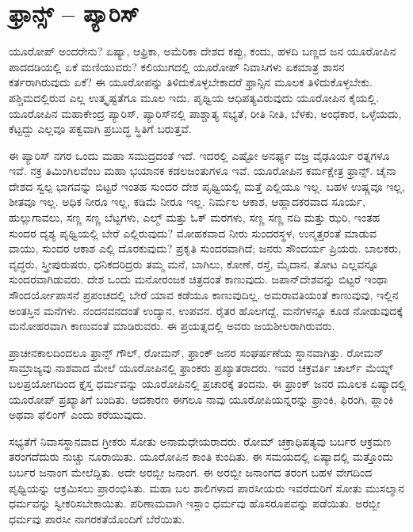 \newpage

\section*{ಫ್ರಾನ್ಸ್ – ಪ್ಯಾರಿಸ್}

ಯೂರೋಪ್​ ಅಂದರೇನು? ಏಷ್ಯಾ, ಆಫ್ರಿಕಾ, ಅಮೆರಿಕಾ ದೇಶದ ಕಪ್ಪು, ಕಂದು, ಹಳದಿ ಬಣ್ಣದ ಜನ ಯೂರೋಪಿನ ಪಾದದಡಿಯಲ್ಲಿ ಏಕೆ ಮಣಿಯುವರು? ಕಲಿಯುಗದಲ್ಲಿ ಯೂರೋಪ್​ ನಿವಾಸಿಗಳು ಏಕಮಾತ್ರ ಶಾಸನ ಕರ್ತರಾಗಿರುವುದು ಏಕೆ? ಈ ಯೂರೋಪನ್ನು ತಿಳಿದುಕೊಳ್ಳಬೇಕಾದರೆ ಫ್ರಾನ್ಸಿನ ಮೂಲಕ ತಿಳಿದುಕೊಳ್ಳಬೇಕು. ಪಶ್ಚಿಮದಲ್ಲಿರುವ ಎಲ್ಲ ಉತ್ಕೃಷ್ಟತೆಗೂ ಮೂಲ ಇದು. ಪೃಥ್ವಿಯ ಆಧಿಪತ್ಯವಿರುವುದು ಯೂರೋಪಿನ ಕೈಯಲ್ಲಿ. ಯೂರೋಪಿನ ಮಹಾಕೇಂದ್ರ ಪ್ಯಾರಿಸ್​. ಪ್ಯಾರಿಸ್​ನಲ್ಲಿ ಪಾಶ್ಚಾತ್ಯ ಸಭ್ಯತೆ, ರೀತಿ ನೀತಿ, ಬೆಳಕು, ಅಂಧಕಾರ, ಒಳ್ಳೆಯದು, ಕೆಟ್ಟದ್ದು ಎಲ್ಲವೂ ಪಕ್ವವಾಗಿ ಪ್ರಬುದ್ಧ ಸ್ಥಿತಿಗೆ ಬರುತ್ತವೆ.

ಈ ಪ್ಯಾರಿಸ್​ ನಗರ ಒಂದು ಮಹಾ ಸಮುದ್ರದಂತೆ ಇದೆ. ಇದರಲ್ಲಿ ಎಷ್ಟೋ ಅನರ್ಘ್ಯ ವಜ್ರ ವೈಢೂರ್ಯ ರತ್ನಗಳೂ ಇವೆ. ನಕ್ರ ತಿಮಿಂಗಿಲವೆಂಬ ಮಹಾ ಭಯಾನಕ ಕಡಲಜಂತುಗಳೂ ಇವೆ. ಯೂರೋಪಿನ ಕರ್ಮಕ್ಷೇತ್ರ ಫ್ರಾನ್ಸ್​. ಚೈನಾ ದೇಶದ ಸ್ವಲ್ಪ ಭಾಗವನ್ನು ಬಿಟ್ಟರೆ ಇಂತಹ ಸುಂದರ ದೇಶ ಪೃಥ್ವಿಯಲ್ಲಿ ಮತ್ತೆ ಎಲ್ಲಿಯೂ ಇಲ್ಲ. ಬಹಳ ಉಷ್ಣವೂ ಇಲ್ಲ, ಶೀತವೂ ಇಲ್ಲ. ಅಧಿಕ ನೀರೂ ಇಲ್ಲ, ಕಡಿಮೆ ನೀರೂ ಇಲ್ಲ. ನಿರ್ಮಲ ಆಕಾಶ, ಆಹ್ಲಾದಕರವಾದ ಸೂರ್ಯ, ಹುಲ್ಲುಗಾವಲು, ಸಣ್ಣ ಸಣ್ಣ ಬೆಟ್ಟಗಳು, ಎಲ್ಮ್​ ಮತ್ತು ಓಕ್​ ಮರಗಳು, ಸಣ್ಣ ಸಣ್ಣ ನದಿ ಮತ್ತು ಝರಿ, ಇಂತಹ ಸುಂದರ ದೃಶ್ಯ ಪೃಥ್ವಿಯಲ್ಲಿ ಬೇರೆ ಎಲ್ಲಿರುವುದು? ಮೋಹಕವಾದ ನೀರು ಸುಂದರಸ್ಥಳ, ಉನ್ಮತ್ತರಂತೆ ಮಾಡುವ ವಾಯು, ಸುಂದರ ಆಕಾಶ ಎಲ್ಲಿ ದೊರಕುವುದು? ಪ್ರಕೃತಿ ಸುಂದರವಾಗಿದೆ; ಜನರು ಸೌಂದರ್ಯ ಪ್ರಿಯರು. ಬಾಲಕರು, ವೃದ್ಧರು, ಸ್ತ್ರೀಪುರುಷರು, ಧನಿಕದರಿದ್ರರು ತಮ್ಮ ಮನೆ, ಬಾಗಿಲು, ಕೋಣೆ, ರಸ್ತೆ, ಮೈದಾನ, ತೋಟ ಎಲ್ಲವನ್ನೂ ಸುಂದರವಾಗಿಡುವರು. ದೇಶ ಒಂದು ಮನೋರಂಜಕ ಚಿತ್ರದಂತೆ ಕಾಣುವುದು. ಜಪಾನ್​ ದೇಶವನ್ನು ಬಿಟ್ಟರೆ ಇಂಥಾ ಸೌಂದರ್ಯೋಪಾಸನೆ ಪ್ರಪಂಚದಲ್ಲಿ ಬೇರೆ ಯಾವ ಕಡೆಯೂ ಕಾಣುವುದಿಲ್ಲ. ಅಮರಾವತಿಯಂತೆ ಕಾಣುವುವು, ಇಲ್ಲಿನ ಅಂತಸ್ತಿನ ಮನೆಗಳು. ನಂದನವನದಂತೆ ಉದ್ಯಾನ, ಉಪವನ. ರೈತರ ಹೊಲಗದ್ದೆ, ಮನೆಗಳನ್ನೂ ಕೂಡ ನೋಡುವುದಕ್ಕೆ ಮನೋಹರವಾಗಿ ಕಾಣುವಂತೆ ಮಾಡಿರುವರು. ಈ ಪ್ರಯತ್ನದಲ್ಲಿ ಅವರು ಜಯಶೀಲರಾಗಿರುವರು.

ಪ್ರಾಚೀನಕಾಲದಿಂದಲೂ ಫ್ರಾನ್ಸ್​ ಗೌಲ್​, ರೋಮನ್​, ಫ್ರಾಂಕ್​ ಜನರ ಸಂಘರ್ಷಣೆಯ ಸ್ಥಾನವಾಗಿತ್ತು. ರೋಮನ್​ ಸಾಮ್ರಾಜ್ಯವು ನಾಶವಾದ ಮೇಲೆ ಯೂರೋಪಿನಲ್ಲಿ ಫ್ರಾಂಕರು ಪ್ರಖ್ಯಾತರಾದರು. ಇವರ ಚಕ್ರವರ್ತಿ ಚಾರ್ಲ್​ ಮೆಯ್ನ್​ ಬಲಪ್ರಯೋಗದಿಂದ ಕ್ತೈಸ್ತ ಧರ್ಮವನ್ನು ಯೂರೋಪಿನಲ್ಲಿ ಪ್ರಚಾರಕ್ಕೆ ತಂದನು. ಈ ಫ್ರಾಂಕ್​ ಜನರ ಮೂಲಕ ಏಷ್ಯಾದಲ್ಲಿ ಯೂರೋಪ್​ ಪ್ರಖ್ಯಾತಿಗೆ ಬಂದಿತು. ಆದಕಾರಣ ಈಗಲೂ ನಾವು ಯೂರೋಪಿಯನ್ನರನ್ನು ಫ್ರಾಂಕಿ, ಫಿರಂಗಿ, ಪ್ಲಾಂಕಿ ಅಥವಾ ಫೆಲಿಂಗ್​ ಎಂದು ಕರೆಯುವುದು.

ಸಭ್ಯತೆಗೆ ನಿವಾಸಸ್ಥಾನವಾದ ಗ್ರೀಕರು ಸೋತು ಅನಾಮಧೇಯರಾದರು. ರೋಮ್​ ಚಕ್ರಾಧಿಪತ್ಯವು ಬರ್ಬರ ಆಕ್ರಮಣ ತರಂಗದೆದುರು ನುಚ್ಚು ನೂರಾಯಿತು. ಯೂರೋಪಿನ ಕಾಂತಿ ಕುಂದಿತು. ಈ ಸಮಯದಲ್ಲಿ ಏಷ್ಯಾದಲ್ಲಿ ಮತ್ತೊಂದು ಬರ್ಬರ ಜನಾಂಗ ಮೇಲೆದ್ದಿತು. ಅದೇ ಅರಬ್ಬೀ ಜನಾಂಗ. ಈ ಅರಬ್ಬೀ ಜನಾಂಗದ ತರಂಗ ಬಹಳ ವೇಗದಿಂದ ಪೃಥ್ವಿಯನ್ನು ಆಕ್ರಮಿಸಲು ಪ್ರಾರಂಭಿಸಿತು. ಮಹಾ ಬಲ ಶಾಲಿಗಳಾದ ಪಾರಸೀಯರು ಇವರೆದುರಿಗೆ ಸೋತು ಮುಸಲ್ಮಾನ ಧರ್ಮವನ್ನು ಸ್ವೀಕರಿಸಬೇಕಾಯಿತು. ಪರಿಣಾಮವಾಗಿ ಇಸ್ಲಾಂ ಧರ್ಮವು ಹೊಸರೂಪವನ್ನು ಪಡೆಯಿತು. ಅರಬ್ಬೀ ಧರ್ಮವು ಪಾರಸೀ ನಾಗರಕತೆಯೊಂದಿಗೆ ಬೆರೆಯಿತು.

